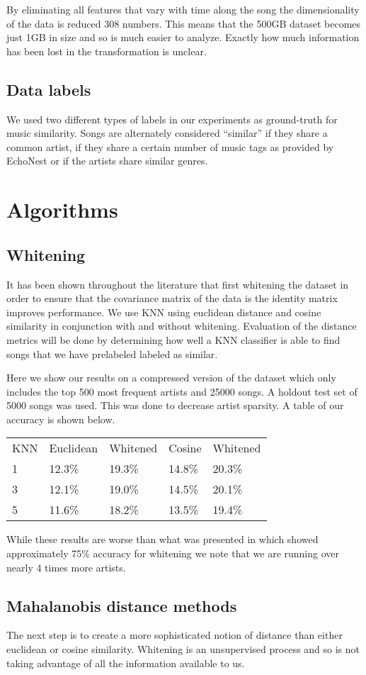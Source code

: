 \documentclass[a4paper,10pt]{article}
\begin{document}
By eliminating all features that vary with time along the song the dimensionality of the data is reduced 308 numbers. This means that the 500GB dataset becomes just 1GB in size and so is much easier to analyze. Exactly how much information has been lost in the transformation is unclear. 
\subsection{Data labels}
We used two different types of labels in our experiments as ground-truth for music similarity. Songs are alternately considered ``similar'' if they share a common artist, if they share a certain number of music tags as provided by EchoNest or if the artists share similar genres.
\section{Algorithms}
\subsection{Whitening}
It has been shown throughout the literature that first whitening the dataset in order to ensure that the covariance matrix of the data is the identity matrix improves performance. We use KNN using euclidean distance and cosine similarity in conjunction with and without whitening. Evaluation of the distance metrics will be done by determining how well a KNN classifier is able to find songs that we have prelabeled labeled as similar.

Here we show our results on a compressed version of the dataset which only includes the top 500 most frequent artists and 25000 songs. A holdout test set of 5000 songs was used. This was done to decrease artist sparsity. A table of our accuracy is shown below.
\begin{center}
\begin{tabular}{lllll}
KNN & Euclidean & Whitened & Cosine & Whitened\\
1 & 12.3\% & 19.3\% & 14.8\% & 20.3\%\\
3 & 12.1\% & 19.0\% & 14.5\% & 20.1\% \\
5 & 11.6\% & 18.2\% & 13.5\% & 19.4\% 
\end{tabular}
\end{center}
While these results are worse than what was presented in \cite{Slaney_learninga} which showed approximately 75\% accuracy for whitening we note that we are running over nearly 4 times more artists.
\subsection{Mahalanobis distance methods}
The next step is to create a more sophisticated notion of distance than either euclidean or cosine similarity. Whitening is an unsupervised process and so is not taking advantage of all the information available to us. 
\end{document}
